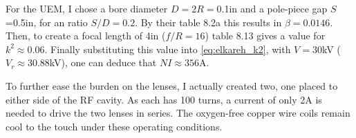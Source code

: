 For the UEM, I chose a bore diameter $D=2R=$0.1in and a pole-piece gap $S$=0.5in, for an ratio $S/D=0.2$.
By their table 8.2a this results in $\beta=0.0146$. Then, to create a focal length of 4in ($f/R=16$) table 8.13 gives a value for $k^2 \approx 0.06$.
Finally substituting this value into \ref{eq:elkareh_k2}, with $V=30$kV ($V_r\approx30.88$kV), one can deduce that $NI\approx356$A.

To further ease the burden on the lenses, I actually created two, one placed to either side of the RF cavity. As each has 100 turns, a current of only 2A is needed to drive the two lenses in series. The oxygen-free copper wire coils remain cool to the touch under these operating conditions.



